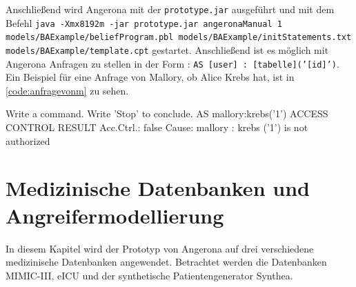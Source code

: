 \documentclass[german,version-2020-11]{uzl-thesis}
\begin{document}
Anschließend wird Angerona mit der \texttt{prototype.jar} ausgeführt und mit dem Befehl \texttt{java -Xmx8192m -jar prototype.jar angeronaManual 1 models/BAExample/beliefProgram.pbl models/BAExample/initStatements.txt models/BAExample/template.cpt} gestartet. Anschließend ist es möglich mit Angerona Anfragen zu stellen in der Form : \texttt{AS [user] : [tabelle]('[id]')}. Ein Beispiel für eine Anfrage von Mallory, ob Alice Krebs hat, ist in \autoref{code:anfragevonm} zu sehen.
\begin{Pseudocode}[caption={Angerona: Anfrage von Mallory ob Alice Krebs hat } , label = {code:anfragevonm} , numbers=left]
Write a command. Write 'Stop' to conclude.
AS mallory:krebs('1')
ACCESS CONTROL RESULT
Acc.Ctrl.: false Cause: mallory : krebs ('1') is not authorized
\end{Pseudocode}

\chapter{Medizinische Datenbanken und Angreifermodellierung}\label{chap:Modellierung}
In diesem Kapitel wird der Prototyp von Angerona auf drei verschiedene medizinische Datenbanken angewendet. Betrachtet werden die Datenbanken MIMIC-III, eICU und der synthetische Patientengenerator Synthea.
\end{document}

